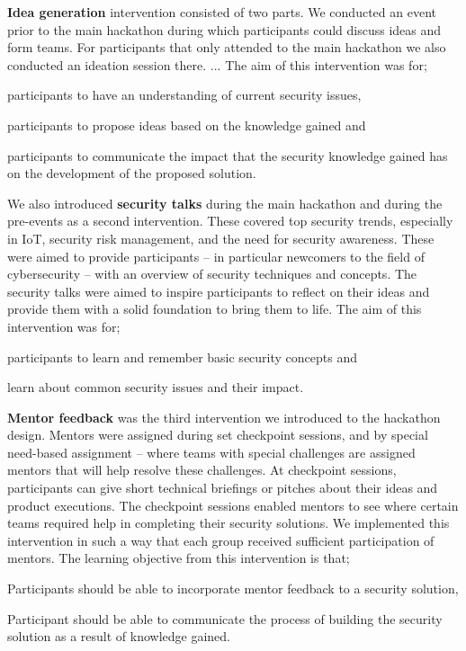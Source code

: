 \documentclass[runningheads]{llncs}
\begin{document}
\textbf{Idea generation} intervention consisted of two parts. We conducted an event prior to the main hackathon during which participants could discuss ideas and form teams. For participants that only attended to the main hackathon we also conducted an ideation session there.
...
The aim of this intervention was for; \begin{enumerate*}[label=(\arabic*)]
  \item participants to have an understanding of current security issues,
  \item participants to propose ideas based on the knowledge gained and
  \item participants to communicate the impact that the security knowledge gained has on the development of the proposed solution.
\end{enumerate*}

We also introduced \textbf{security talks} during the main hackathon and during the pre-events as a second intervention. These covered top security trends, especially in IoT, security risk management, and the need for security awareness. These were aimed to provide participants -- in particular newcomers to the field of cybersecurity -- with an overview of security techniques and concepts. The security talks were aimed to inspire participants to reflect on their ideas and provide them with a solid foundation to bring them to life. The aim of this intervention was for;
\begin{enumerate*}[label=(\arabic*)]
  \item participants to learn and remember basic security concepts and
  \item learn about common security issues and their impact.
\end{enumerate*}

\textbf{Mentor feedback} was the third intervention we introduced to the hackathon design. Mentors were assigned during set checkpoint sessions, and by special need-based assignment -- where teams with special challenges are assigned mentors that will help resolve these challenges. At checkpoint sessions, participants can give short technical briefings or pitches about their ideas and product executions. The checkpoint sessions enabled mentors to see where certain teams required help in completing their security solutions. 
We implemented this intervention in such a way that each group received sufficient participation of mentors. The learning objective from this intervention is that;
\begin{enumerate*}[label=(\arabic*)]
  \item Participants should be able to incorporate mentor feedback to a security solution,
  \item Participant should be able to communicate the process of building the security solution as a result of knowledge gained.
\end{enumerate*}
 
\end{document}
